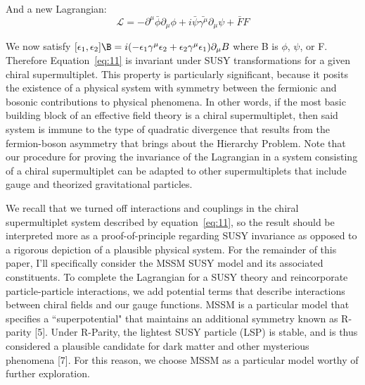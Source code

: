 \documentclass{article}
\begin{document}
And a new Lagrangian:
\begin{equation} \label{eq:11}
    {\mathcal{L}} = -{\partial}^{\mu}\bar{\phi}\partial_{\mu}\phi + i\bar{\psi}\bar{\gamma^{\mu}}\partial_{\mu}\psi + \bar{F}F
\end{equation}
\par
We now satisfy $[\epsilon_{1}, \epsilon_{2}]\B = i(-\epsilon_{1}\gamma^{\mu}\epsilon_{2} + \epsilon_{2}\gamma^{\mu}\epsilon_{1})\partial_{\mu}{B}$ where B is $\phi$, $\psi$, or F. Therefore Equation~\ref{eq:11} is invariant under SUSY transformations for a given chiral supermultiplet. This property is particularly significant, because it posits the existence of a physical system with symmetry between the fermionic and bosonic contributions to physical phenomena. In other words, if the most basic building block of an effective field theory is a chiral supermultiplet, then said system is immune to the type of quadratic divergence that results from the fermion-boson asymmetry that brings about the Hierarchy Problem. Note that our procedure for proving the invariance of the Lagrangian in a system consisting of a chiral supermultiplet can be adapted to other supermultiplets that include gauge and theorized gravitational particles.
\par
We recall that we turned off interactions and couplings in the chiral supermultiplet system described by equation~\ref{eq:11}, so the result should be interpreted more as a proof-of-principle regarding SUSY invariance as opposed to a rigorous depiction of a plausible physical system. For the remainder of this paper, I'll specifically consider the MSSM SUSY model and its associated constituents. To complete the Lagrangian for a SUSY theory and reincorporate particle-particle interactions, we add potential terms that describe interactions between chiral fields and our gauge functions. MSSM is a particular model that specifies a ``superpotential"  that maintains an additional symmetry known as R-parity [5]. Under R-Parity, the lightest SUSY particle (LSP) is stable, and is thus considered a plausible candidate for dark matter and other mysterious phenomena [7]. For this reason, we choose MSSM as a particular model worthy of further exploration.
\end{document}
